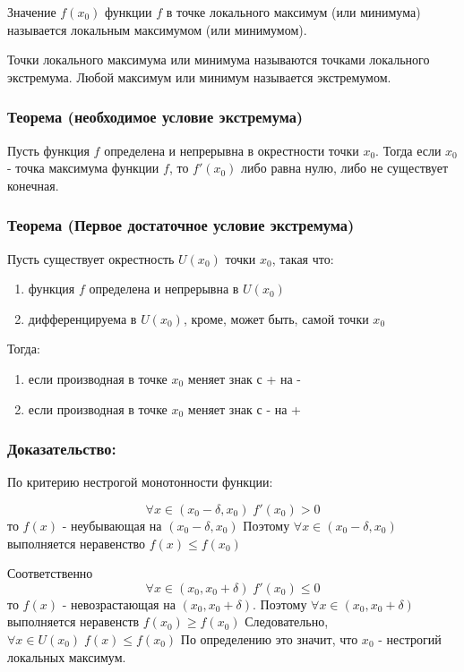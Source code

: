 \documentclass[a4paper,12pt]{article}
\theoremstyle{plain} %
\theoremstyle{definition} %
\theoremstyle{remark} %
\begin{document}
Значение $f(x_0)$ функции $f$ в точке локального максимум (или минимума) называется локальным максимумом (или минимумом).

Точки локального максимума или минимума называются точками локального экстремума. Любой максимум или минимум называется экстремумом.

\subsubsection*{Теорема (необходимое условие экстремума)}

Пусть функция $f$ определена и непрерывна в окрестности точки $x_0$. Тогда если $x_0$ - точка максимума функции $f$, то $f'(x_0)$ либо равна нулю, либо не существует конечная.

\subsubsection*{Теорема (Первое достаточное условие экстремума)}

Пусть существует окрестность $U(x_0)$ точки $x_0$, такая что:

\begin{enumerate}
	\item функция $f$ определена и непрерывна в $U(x_0)$
	\item дифференцируема в $U(x_0)$, кроме, может быть, самой точки $x_0$
\end{enumerate}
Тогда:
\begin{enumerate}
	\item если производная в точке $x_0$ меняет знак с + на -
	\item если производная в точке $x_0$ меняет знак с - на +
\end{enumerate}

\subsubsection*{Доказательство:}

По критерию нестрогой монотонности функции:

\[
	\forall x \in (x_0 - \delta, x_0) \;  f'(x_0) > 0
\]
то $f(x)$ - неубывающая на $(x_0 - \delta, x_0)$  Поэтому $\forall x \in (x_0 - \delta, x_0)$ выполняется неравенство $f(x) \leq f(x_0)$

Соответственно \[\forall x \in (x_0, x_0 + \delta) \; f'(x_0) \leq 0 \] то $f(x)$ - невозрастающая на $(x_0, x_0 + \delta)$. Поэтому $\forall x \in (x_0, x_0 + \delta)$ выполняется неравенств $f(x_0) \geq f(x_0)$
Следовательно, $\forall x \in U(x_0) \; f(x) \leq f(x_0)$
По определению это значит, что $x_0$ - нестрогий локальных максимум.
\end{document}
